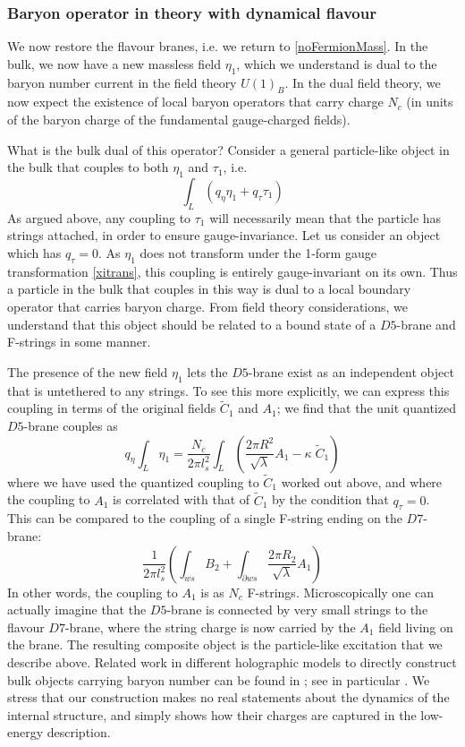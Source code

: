 \documentclass[aps,preprint,nofootinbib,preprintnumbers,eqsecnum,superscriptaddress]{revtex4}
\newcommand\p{\ensuremath{\partial}}
\newcommand\lam{\lambda}
\def\le{\left}
\def\ri{\right}
\begin{document}
\subsubsection{Baryon operator in theory with dynamical flavour}
We now restore the flavour branes, i.e. we return to \eqref{noFermionMass}. In the bulk, we now have a new massless field $\eta_1$, which we understand is dual to the baryon number current in the field theory $U(1)_B$. In the dual field theory, we now expect the existence of local baryon operators that carry charge $N_c$ (in units of the baryon charge of the fundamental gauge-charged fields). 

What is the bulk dual of this operator? Consider a general particle-like object in the bulk that couples to both $\eta_1$ and $\tau_1$, i.e.
\begin{equation}
\int_{L} \le(q_{\eta} \eta_1 + q_{\tau} \tau_1\ri)
\end{equation}
As argued above, any coupling to $\tau_1$ will necessarily mean that the particle has strings attached, in order to ensure gauge-invariance. Let us consider an object which has $q_{\tau} = 0$. As $\eta_1$ does not transform under the 1-form gauge transformation \eqref{xitrans}, this coupling is entirely gauge-invariant on its own. Thus a particle in the bulk that couples in this way is dual to a local boundary operator that carries baryon charge. From field theory considerations, we understand that this object should be related to a bound state of a $D5$-brane and F-strings in some manner. 

The presence of the new field $\eta_1$ lets the $D5$-brane exist as an independent object that is untethered to any strings. To see this more explicitly, we can express this coupling in terms of the original fields $\tilde{C}_1$ and $A_1$; we find that the unit quantized $D5$-brane couples as
\begin{equation}
q_{\eta} \int_{L} \eta_1 = \frac{N_c}{2\pi l_{s}^2} \int_{L} \le(\frac{2 \pi R^2}{\sqrt{\lam}} A_1 - \kappa \; \tilde{C}_1 \ri)
\end{equation}
where we have used the quantized coupling to $\tilde{C}_1$ worked out above, and where the coupling to $A_1$ is correlated with that of $\tilde{C}_1$ by the condition that $q_{\tau} = 0$. This can be compared to the coupling of a single F-string ending on the $D7$-brane:
\begin{equation}
\frac{1}{2\pi l_s^2}\le(\int_{ws} B_2 + \int_{\p ws} \frac{2 \pi R_2}{\sqrt{\lam}} A_1\ri)
\end{equation}
In other words, the coupling to $A_1$ is as $N_c$ F-strings. Microscopically one can actually imagine that the $D5$-brane is connected by very small strings to the flavour $D7$-brane, where the string charge is now carried by the $A_1$ field living on the brane. The resulting composite object is the particle-like excitation that we describe above. Related work in different holographic models to directly construct bulk objects carrying baryon number can be found in \cite{Hata:2007mb,Seki:2008mu,Sfetsos:2008yr}; see in particular \cite{Sfetsos:2008yr}. We stress that our construction makes no real statements about the dynamics of the internal structure, and simply shows how their charges are captured in the low-energy description. 
\end{document}
